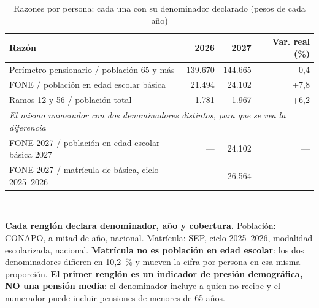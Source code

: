 \begin{table}[htbp]\centering\footnotesize
\caption{Razones por persona: cada una con su denominador declarado (pesos de cada año)}\label{cua:percap}
\begin{tabular}{lrrr}
\toprule
Razón & 2026 & 2027 & Var. real (\%) \\
\midrule
Perímetro pensionario / población 65 y más & 139.670 & 144.665 & $-$0,4 \\
FONE / población en edad escolar básica & 21.494 & 24.102 & +7,8 \\
Ramos 12 y 56 / población total & 1.781 & 1.967 & +6,2 \\
\midrule \multicolumn{4}{l}{\emph{El mismo numerador con dos denominadores distintos, para que se vea la diferencia}} \\
FONE 2027 / población en edad escolar básica 2027 & --- & 24.102 & --- \\
FONE 2027 / matrícula de básica, ciclo 2025--2026 & --- & 26.564 & --- \\
\bottomrule
\end{tabular}
\\[2pt]\begin{minipage}{0.92\textwidth}\scriptsize \textbf{Cada renglón declara denominador, año y cobertura.} Población: CONAPO, a mitad de año, nacional. Matrícula: SEP, ciclo 2025--2026, modalidad escolarizada, nacional. \textbf{Matrícula no es población en edad escolar}: los dos denominadores difieren en 10,2~\% y mueven la cifra por persona en esa misma proporción. \textbf{El primer renglón es un indicador de presión demográfica, NO una pensión media}: el denominador incluye a quien no recibe y el numerador puede incluir pensiones de menores de 65 años.\end{minipage}
\end{table}
